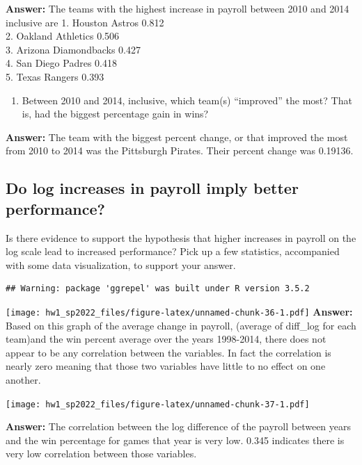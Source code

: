 \documentclass[
]{article}
\providecommand{\tightlist}{%
  \setlength{\itemsep}{0pt}\setlength{\parskip}{0pt}}
\begin{document}
\textbf{Answer:} The teams with the highest increase in payroll between
2010 and 2014 inclusive are 1. Houston Astros 0.812\\
2. Oakland Athletics 0.506\\
3. Arizona Diamondbacks 0.427\\
4. San Diego Padres 0.418\\
5. Texas Rangers 0.393

\begin{enumerate}
\def\labelenumi{\roman{enumi}.}
\setcounter{enumi}{1}
\tightlist
\item
  Between 2010 and 2014, inclusive, which team(s) ``improved'' the most?
  That is, had the biggest percentage gain in wins?
\end{enumerate}

\textbf{Answer:} The team with the biggest percent change, or that
improved the most from 2010 to 2014 was the Pittsburgh Pirates. Their
percent change was 0.19136.

\hypertarget{do-log-increases-in-payroll-imply-better-performance}{%
\subsection{Do log increases in payroll imply better
performance?}\label{do-log-increases-in-payroll-imply-better-performance}}

Is there evidence to support the hypothesis that higher increases in
payroll on the log scale lead to increased performance? Pick up a few
statistics, accompanied with some data visualization, to support your
answer.

\begin{verbatim}
## Warning: package 'ggrepel' was built under R version 3.5.2
\end{verbatim}

\texttt{[image: hw1\_sp2022\_files/figure-latex/unnamed-chunk-36-1.pdf]}
\textbf{Answer:} Based on this graph of the average change in payroll,
(average of diff\_log for each team)and the win percent average over the
years 1998-2014, there does not appear to be any correlation between the
variables. In fact the correlation is nearly zero meaning that those two
variables have little to no effect on one another.

\texttt{[image: hw1\_sp2022\_files/figure-latex/unnamed-chunk-37-1.pdf]}

\textbf{Answer:} The correlation between the log difference of the
payroll between years and the win percentage for games that year is very
low. 0.345 indicates there is very low correlation between those
variables.
\end{document}
